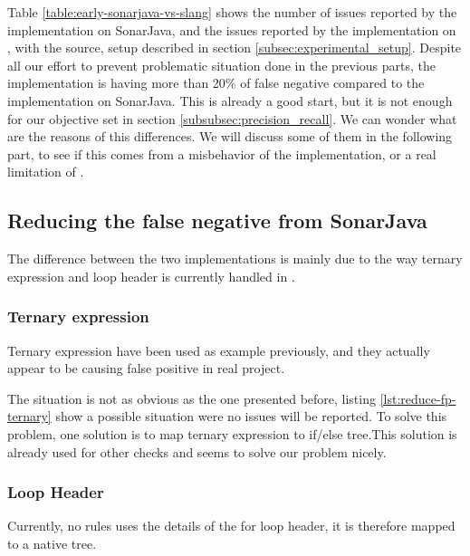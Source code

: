 Table \ref{table:early-sonarjava-vs-slang} shows the number of issues reported by the implementation on SonarJava, and the issues reported by the implementation on \slang, with the source, setup described in section \ref{subsec:experimental_setup}. 
Despite all our effort to prevent problematic situation done in the previous parts,  the implementation is having more than 20\% of false negative compared to the implementation on SonarJava. This is already a good start, but it is not enough for our objective set in section \ref{subsubsec:precision_recall}.
We can wonder what are the reasons of this differences.
We will discuss some of them in the following part, to see if this comes from a misbehavior of the implementation, or a real limitation of \slang.

\subsection{Reducing the false negative from SonarJava}
\label{subsec:reducing_false_positive_sonarjava}

The difference between the two implementations is mainly due to the way ternary expression and loop header is currently handled in \slang.

\subsubsection{Ternary expression}
\label{subsubsec:reducing_false_positive_ternary}
Ternary expression have been used as example previously, and they actually appear to be causing false positive in real project.



The situation is not as obvious as the one presented before, listing \ref{lst:reduce-fp-ternary} show a possible situation were no issues will be reported. To solve this problem, one solution is to map ternary expression to if/else tree.This solution is already used for other checks and seems to solve our problem nicely.

\subsubsection{Loop Header}
\label{subsubsec:loop_header}

Currently, no rules uses the details of the for loop header, it is therefore mapped to a native tree. 

